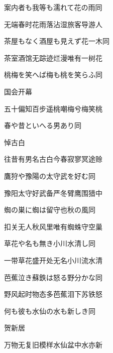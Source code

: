 \begin{haiku}
    {\FH 案内者も我等も濡れて花の雨}\hfill{\FH 同}

    {\FK 无端春时花雨落沾湿旅客导游人}
\end{haiku}

\begin{haiku}
    {\FH 茶屋もなく酒屋も見えず花一木}\hfill{\FH 同}

    {\FK 茶室酒馆无踪迹烂漫唯有一树花}
\end{haiku}

\begin{haiku}
    {\FH 桃梅を笑へば梅も桃を笑らふ}\hfill{\FH 同}

    {\FK 国会开幕}

    {\FK 五十偏知百步遥桃嘲梅兮梅笑桃}
\end{haiku}

\begin{haiku}
    {\FH 春や昔といへる男あり}\hfill{\FH 同}

    {\FK 悼古白}

    {\FK 往昔有男名古白今春寂寥冥途赊}
\end{haiku}

\begin{haiku}
    {\FH 鷹狩や豫陽の太守武を好む}\hfill{\FH 同}

    {\FK 豫阳太守好武备严冬臂鹰围猎中}
\end{haiku}

\begin{haiku}
    {\FH 蜘の巣に蜘は留守也秋の風}\hfill{\FH 同}

    {\FK 扣关无人秋风里唯有蜘蛛守空巢}
\end{haiku}

\begin{haiku}
    {\FH 草花や名も無き小川水清し}\hfill{\FH 同}

    {\FK 一带草花盛开处无名小川流水清}
\end{haiku}

\begin{haiku}
    {\FH 芭蕉泣き蘇鉄は怒る野分かな}\hfill{\FH 同}

    {\FK 野风起时物态多芭蕉泪下苏铁怒}
\end{haiku}

\begin{haiku}
    {\FH 何も彼も水仙の水も新しき}\hfill{\FH 同}

    {\FK 贺新居}

    {\FK 万物无复旧模样水仙盆中水亦新}
\end{haiku}

